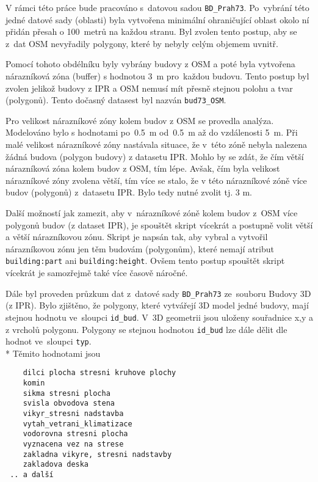 V rámci této práce bude pracováno s~datovou sadou
{\tt BD\_Prah73}. Po~vybrání této jedné datové sady (oblasti) byla
vytvořena minimální ohraničující oblast okolo ní přidán přesah o
100~metrů na každou stranu. Byl zvolen tento postup, aby se z~dat
OSM nevyřadily polygony, které by nebyly celým objemem uvnitř.

Pomocí tohoto obdélníku byly vybrány budovy z OSM a poté byla vytvořena nárazníková zóna (buffer) s hodnotou
3~m pro~každou budovu. Tento postup byl zvolen jelikož budovy z IPR a
OSM nemusí mít přesně stejnou polohu a tvar (polygonů). Tento dočasný
datasest byl nazván {\tt bud73\_OSM}.

Pro velikost nárazníkové zóny kolem budov z OSM se provedla analýza.
Modelováno bylo s hodnotami po~0.5~m od~0.5~m až do vzdálenosti 5~m.
Při malé velikost nárazníkové zóny nastávala situace, že v~této zóně
nebyla nalezena žádná budova (polygon budovy) z datasetu IPR. Mohlo by
se zdát, že čím větší nárazníková zóna kolem budov z OSM, tím lépe.
Avšak, čím byla velikost nárazníkové zóny zvolena větší, tím více se
stalo, že v této nárazníkové zóně  více budov (polygonů)
z~datasetu IPR. Bylo tedy nutné zvolit  tj. 3 m.

Další možností jak zamezit, aby v~nárazníkové zóně kolem budov
z~OSM  více polygonů budov (z dataset IPR), je spouštět skript
vícekrát a postupně volit větší a větší nárazníkovou zónu. Skript je
napsán tak, aby vybral a vytvořil nárazníkovou zónu jen těm budovám
(polygonům), které nemají atribut {\tt building:part} ani
{\tt building:height}. Ovšem tento postup spouštět skript vícekrát je
samozřejmě také více časově náročné.

Dále byl proveden průzkum dat z~datové sady {\tt BD\_Prah73} 
ze~souboru Budovy 3D (z IPR). Bylo zjištěno, že polygony, které
vytvářejí 3D model jedné budovy, mají stejnou hodnotu ve~sloupci
{\tt id\_bud}. V~3D geometrii jsou uloženy  souřadnice
x,y a z vrcholů polygonu. Polygony se
stejnou hodnotou {\tt id\_bud} lze dále dělit dle hodnot
ve~sloupci {\tt typ}.
\\*
Těmito hodnotami jsou
\begin{verbatim}
    dilci plocha stresni kruhove plochy
    komin
    sikma stresni plocha
    svisla obvodova stena
    vikyr_stresni nadstavba
    vytah_vetrani_klimatizace
    vodorovna stresni plocha
    vyznacena vez na strese
    zakladna vikyre, stresni nadstavby
    zakladova deska
 .. a další
\end{verbatim}

